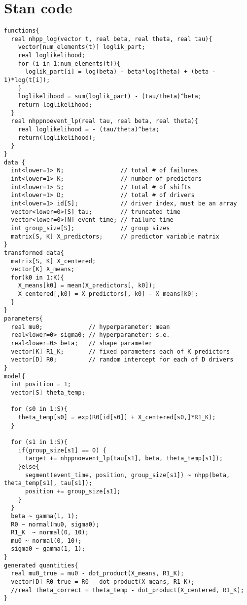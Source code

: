 \documentclass[
]{article}
\begin{document}
\hypertarget{stan-code}{%
\section{Stan code}\label{stan-code}}

\begin{verbatim}
functions{
  real nhpp_log(vector t, real beta, real theta, real tau){
    vector[num_elements(t)] loglik_part;
    real loglikelihood;
    for (i in 1:num_elements(t)){
      loglik_part[i] = log(beta) - beta*log(theta) + (beta - 1)*log(t[i]);
    }
    loglikelihood = sum(loglik_part) - (tau/theta)^beta;
    return loglikelihood;
  }
  real nhppnoevent_lp(real tau, real beta, real theta){
    real loglikelihood = - (tau/theta)^beta;
    return(loglikelihood);
  }
}
data {
  int<lower=1> N;                // total # of failures
  int<lower=1> K;                // number of predictors
  int<lower=1> S;                // total # of shifts
  int<lower=1> D;                // total # of drivers
  int<lower=1> id[S];            // driver index, must be an array
  vector<lower=0>[S] tau;        // truncated time
  vector<lower=0>[N] event_time; // failure time
  int group_size[S];             // group sizes
  matrix[S, K] X_predictors;     // predictor variable matrix
}
transformed data{
  matrix[S, K] X_centered;
  vector[K] X_means;
  for(k0 in 1:K){
    X_means[k0] = mean(X_predictors[, k0]);
    X_centered[,k0] = X_predictors[, k0] - X_means[k0];
  }
}
parameters{
  real mu0;             // hyperparameter: mean
  real<lower=0> sigma0; // hyperparameter: s.e.
  real<lower=0> beta;   // shape parameter
  vector[K] R1_K;       // fixed parameters each of K predictors
  vector[D] R0;         // random intercept for each of D drivers
}
model{
  int position = 1;
  vector[S] theta_temp;

  for (s0 in 1:S){
    theta_temp[s0] = exp(R0[id[s0]] + X_centered[s0,]*R1_K);
  }

  for (s1 in 1:S){
    if(group_size[s1] == 0) {
      target += nhppnoevent_lp(tau[s1], beta, theta_temp[s1]);
    }else{
      segment(event_time, position, group_size[s1]) ~ nhpp(beta, theta_temp[s1], tau[s1]);
      position += group_size[s1];
    }
  }
  beta ~ gamma(1, 1);
  R0 ~ normal(mu0, sigma0);
  R1_K  ~ normal(0, 10);
  mu0 ~ normal(0, 10);
  sigma0 ~ gamma(1, 1);
}
generated quantities{
  real mu0_true = mu0 - dot_product(X_means, R1_K);
  vector[D] R0_true = R0 - dot_product(X_means, R1_K);
  //real theta_correct = theta_temp - dot_product(X_centered, R1_K);
}
\end{verbatim}
\end{document}
